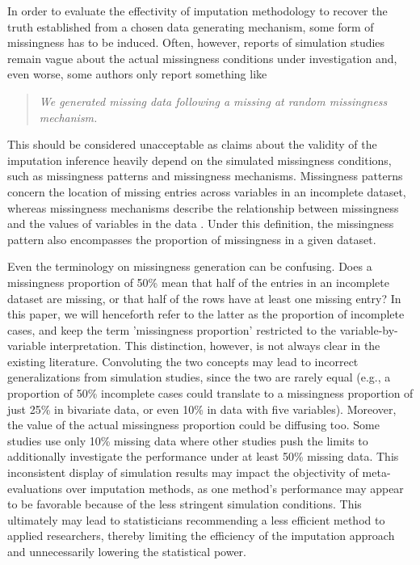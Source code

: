 \documentclass[bimj,fleqn]{w-art}
\theoremstyle{plain}
\theoremstyle{definition}
\begin{document}
In order to evaluate the effectivity of imputation methodology to recover the truth established from a chosen data generating mechanism, some form of missingness has to be induced. Often, however, reports of simulation studies remain vague about the actual missingness conditions under investigation and, even worse, some authors only report something like
\begin{quote}
\textit{We generated missing data following a missing at random missingness mechanism.}
\end{quote}
This should be considered unacceptable as claims about the validity of the imputation inference heavily depend on the simulated missingness conditions, such as missingness patterns and missingness mechanisms. Missingness patterns concern the location of missing entries across variables in an incomplete dataset, whereas missingness mechanisms describe the relationship between missingness and the values of variables in the data \citep[][p. 8]{litt20}. Under this definition, the missingness pattern also encompasses the proportion of missingness in a given dataset. 


Even the terminology on missingness generation can be confusing. Does a missingness proportion of 50\% mean that half of the entries in an incomplete dataset are missing, or that half of the rows have at least one missing entry? In this paper, we will henceforth refer to the latter as the proportion of incomplete cases, and keep the term 'missingness proportion' restricted to the variable-by-variable interpretation. This distinction, however, is not always clear in the existing literature. Convoluting the two concepts may lead to incorrect generalizations from simulation studies, since the two are rarely equal (e.g., a proportion of 50\% incomplete cases could translate to a missingness proportion of just 25\% in bivariate data, or even 10\% in data with five variables). Moreover, the value of the actual missingness proportion could be diffusing too. Some studies use only 10\% missing data where other studies push the limits to additionally investigate the performance under at least 50\% missing data. This inconsistent display of simulation results may impact the objectivity of meta-evaluations over imputation methods, as one method's performance may appear to be favorable because of the less stringent simulation conditions. This ultimately may lead to statisticians recommending a less efficient method to applied researchers, thereby limiting the efficiency of the imputation approach and unnecessarily lowering the statistical power.
\end{document}
